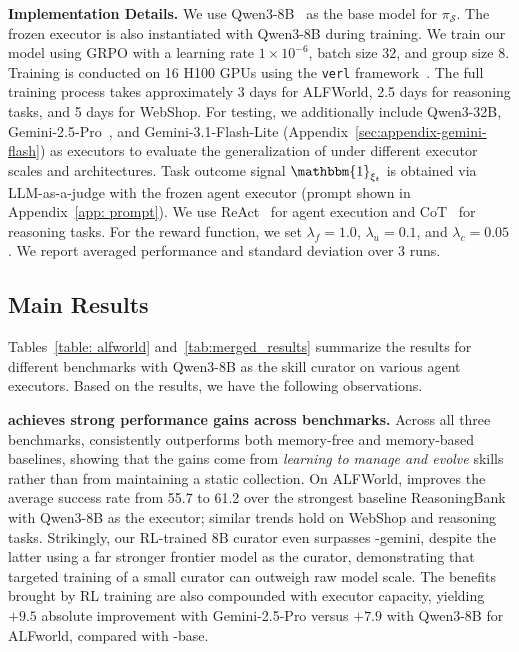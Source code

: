 \noindent\textbf{Implementation Details.} 
We use Qwen3-8B~\citep{DBLP:journals/corr/abs-2505-09388} as the base model for $\pi_{\mathcal{S}}$. The frozen executor is also instantiated with Qwen3-8B during training. We train our model using GRPO with a learning rate $1\times10^{-6}$, batch size $32$, and group size $8$. Training is conducted on 16 H100 GPUs using the \texttt{verl} framework~\citep{sheng2024hybridflow}. The full training process takes approximately 3 days for ALFWorld, 2.5 days for reasoning tasks, and 5 days for WebShop.
For testing, we additionally include Qwen3-32B, Gemini-2.5-Pro~\citep{DBLP:journals/corr/abs-2507-06261}, and Gemini-3.1-Flash-Lite (Appendix~\ref{sec:appendix-gemini-flash}) as executors to evaluate the generalization of \ours{} under different executor scales and architectures. Task outcome signal $\mathbbm{1}_{\xi_t}$ is obtained via LLM-as-a-judge with the frozen agent executor (prompt shown in Appendix~\ref{app: prompt}). We use ReAct~\citep{DBLP:conf/iclr/YaoZYDSN023} for agent execution and CoT~\citep{DBLP:conf/nips/Wei0SBIXCLZ22} for reasoning tasks. For the reward function, we set $\lambda_f=1.0$, $\lambda_u=0.1$, and $\lambda_c=0.05$.
We report averaged performance and standard deviation over 3 runs. 


\subsection{Main Results}


Tables~\ref{table: alfworld} and~\ref{tab:merged_results} summarize the results for different benchmarks with Qwen3-8B as the skill curator on various agent executors. Based on the results, we have the following observations.

\noindent\textbf{\ours{} achieves strong performance gains across benchmarks.}
Across all three benchmarks, \ours{} consistently outperforms both memory-free and memory-based baselines, showing that the gains come from \emph{learning to manage and evolve} skills rather than from maintaining a static collection. On ALFWorld, \ours{} improves the average success rate from 55.7 to 61.2 over the strongest baseline ReasoningBank with Qwen3-8B as the executor; similar trends hold on WebShop and reasoning tasks. Strikingly, our RL-trained 8B curator even surpasses \ours{}-gemini, despite the latter using a far stronger frontier model as the curator, demonstrating that targeted training of a small curator can outweigh raw model scale. The benefits brought by RL training are also compounded with executor capacity, yielding $+9.5$ absolute improvement with Gemini-2.5-Pro versus $+7.9$ with Qwen3-8B for ALFworld, compared with \ours{}-base.

